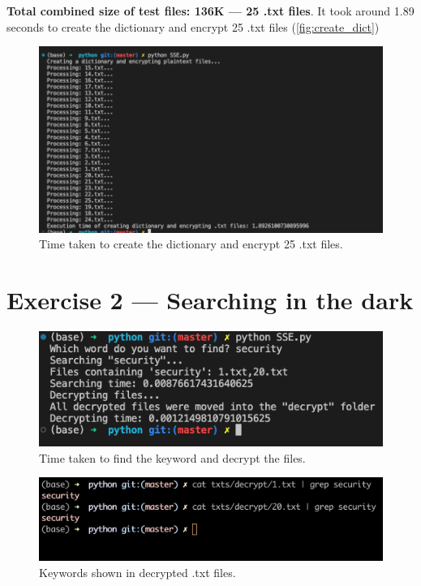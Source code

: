 \documentclass{article}
\begin{document}
\textbf{Total combined size of test files: 136K --- 25 .txt files}.
It took around 1.89 seconds to create the dictionary and encrypt
25 .txt files (\autoref{fig:create_dict})

\begin{figure}[!hpt]
    \centering
    \includegraphics[height=\textheight,width=\textwidth,
    keepaspectratio]{create_dict_time_printing_included.png}
    \caption{Time taken to create the dictionary and encrypt 25 .txt files.}
    \label{fig:create_dict}
\end{figure}

\section*{Exercise 2 --- Searching in the dark}

\begin{figure}[!hpt]
    \centering
    \includegraphics[height=\textheight,width=\textwidth,
    keepaspectratio]{searching_decrypting_time.png}
    \caption{Time taken to find the keyword and decrypt the files.}
\end{figure}

\begin{figure}[!hpt]
    \centering
    \includegraphics[height=\textheight,width=\textwidth,
    keepaspectratio]{keyword_in_decrypted_file.png}
    \caption{Keywords shown in decrypted .txt files.}
\end{figure}
\end{document}
